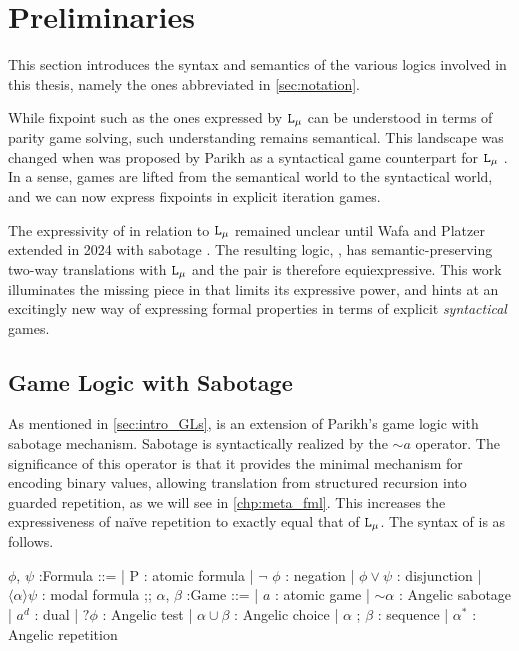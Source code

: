
\chapter{Preliminaries} \label{chp:preliminaries}

This section introduces the syntax and semantics of the various logics involved in this thesis, namely the ones abbreviated in \autoref{sec:notation}.

While fixpoint such as the ones expressed by $\texttt{L}_\mu{}$ can be understood in terms of parity game solving, such understanding remains semantical. This landscape was changed when \GL{} was proposed by Parikh as a syntactical game counterpart for $\texttt{L}_\mu{}$ \cite{Parikh1983}. In a sense, games are lifted from the semantical world to the syntactical world, and we can now express fixpoints in explicit iteration games.

The expressivity of \GL{} in relation to $\texttt{L}_\mu{}$ remained unclear until Wafa and Platzer extended \GL{} in 2024 with sabotage \cite{Wafa_2024}. The resulting logic, \GLs{}, has semantic-preserving two-way translations with $\texttt{L}_\mu{}$ and the pair is therefore equiexpressive. This work illuminates the missing piece in \GL{} that limits its expressive power, and hints at an excitingly new way of expressing formal properties in terms of explicit \textit{syntactical} games.

\section{Game Logic with Sabotage}
\label{sec:Prelim_GLs}

As mentioned in \autoref{sec:intro_GLs}, \GLs{} is an extension of Parikh's game logic \GL{} with sabotage mechanism. Sabotage is syntactically realized by the $\sim a$ operator. The significance of this operator is that it provides the minimal mechanism for encoding binary values, allowing translation from structured recursion into guarded repetition, as we will see in \autoref{chp:meta_fml}. This increases the expressiveness of naïve repetition to exactly equal that of $\texttt{L}_\mu{}$. The syntax of \GLs{} is as follows.

\begin{center}
    \begin {bnf}
        $\phi$, $\psi$ :\textsf{Formula} ::=
        | P : atomic formula
        | $\neg$ $\phi$ : negation
        | $\phi \vee\psi$ : disjunction
        | $\langle\alpha\rangle \psi$ : modal formula
        ;;
        $\alpha$, $\beta$ :\textsf{Game} ::=
        | $a$ : atomic game
        | $\sim \alpha$ : Angelic sabotage
        | $a^d$ : dual
        | $?\phi$ : Angelic test
        | $\alpha\cup\beta$ : Angelic choice
        | $\alpha$ ; $\beta$ : sequence
        | $\alpha^*$ : Angelic repetition
    \end{bnf}
\end{center}

